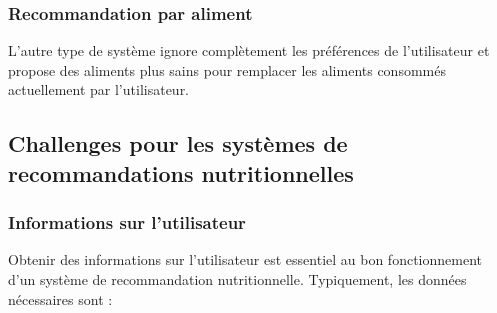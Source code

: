 \documentclass[a4paper, 11pt]{article}
\begin{document}
\subsubsection{Recommandation par aliment}
L'autre type de système ignore complètement les préférences de l'utilisateur et propose des aliments plus sains pour remplacer les aliments consommés actuellement par l'utilisateur.

\subsection{Challenges pour les systèmes de recommandations nutritionnelles}
\subsubsection{Informations sur l'utilisateur}
Obtenir des informations sur l'utilisateur est essentiel au bon fonctionnement d'un système de recommandation nutritionnelle. Typiquement, les données nécessaires sont :
\end{document}
